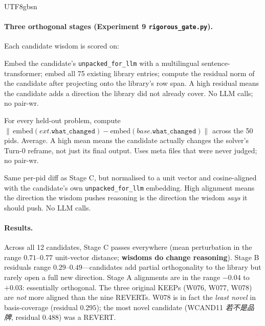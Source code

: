 \documentclass{article}
\begin{document}
\begin{CJK*}{UTF8}{gbsn}
\paragraph{Three orthogonal stages (Experiment 9
\texttt{rigorous\_gate.py}).} Each candidate wisdom is scored on:

\begin{description}[leftmargin=1.5em, topsep=2pt, itemsep=1pt]
  \item[\textbf{Stage B — Basis coverage.}] Embed the candidate's
    \texttt{unpacked\_for\_llm} with a multilingual
    sentence-transformer; embed all 75 existing library
    entries; compute the residual norm of the candidate after
    projecting onto the library's row span. A high residual
    means the candidate adds a direction the library did not
    already cover. No LLM calls; no pair-wr.
  \item[\textbf{Stage C — Perturbation magnitude.}] For every
    held-out problem, compute
    $\|\,\text{embed}(\mathit{ext}.\texttt{what\_changed}) -
      \text{embed}(\mathit{base}.\texttt{what\_changed})\|$
    across the 50 pids. Average. A high mean means the candidate
    actually changes the solver's Turn-0 reframe, not just its
    final output. Uses meta files that were never judged; no
    pair-wr.
  \item[\textbf{Stage A — Faithfulness alignment.}] Same per-pid
    diff as Stage C, but normalised to a unit vector and
    cosine-aligned with the candidate's own
    \texttt{unpacked\_for\_llm} embedding. High alignment means
    the direction the wisdom pushes reasoning is the direction
    the wisdom \emph{says} it should push. No LLM calls.
\end{description}

\paragraph{Results.} Across all 12 candidates, Stage C passes
everywhere (mean perturbation in the range
\(0.71\text{–}0.77\) unit-vector distance; \textbf{wisdoms do
change reasoning}). Stage B residuals range
\(0.29\text{–}0.49\)—candidates add partial orthogonality to
the library but rarely open a full new direction. Stage A
alignments are in the range \(-0.04\) to \(+0.03\): essentially
orthogonal. The three original KEEPs (W076, W077, W078) are
\emph{not} more aligned than the nine REVERTs. W078 is in fact
the \emph{least novel} in basis-coverage (residual \(0.295\));
the most novel candidate (WCAND11 \emph{若不是品牌}, residual
\(0.488\)) was a REVERT.


\end{CJK*}
\end{document}

